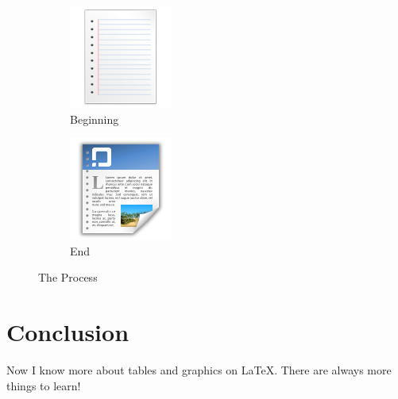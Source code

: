 \documentclass{article}
\begin{document}
\begin{figure}[htbp]
    \centering
    \begin{subfigure}[b]{0.2\textwidth}
        \centering
        \includegraphics[scale=.5]{paper.png}
        \caption{Beginning}
        \label{fig:paper}
    \end{subfigure}
    \begin{subfigure}[b]{0.2\textwidth}
        \centering
        \includegraphics[scale=.5]{page.png}
        \caption{End}
        \label{fig:page}
    \end{subfigure}
    \caption{The Process}
    \label{fig:subs}
\end{figure}

\section{Conclusion}
Now I know more about tables and graphics on \LaTeX.
There are always more things to learn!
\end{document}
